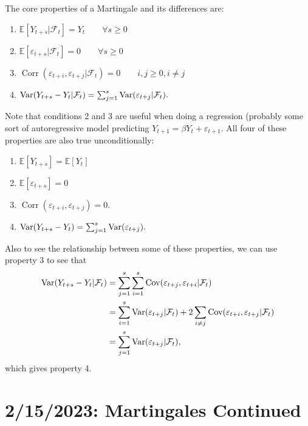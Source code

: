 \documentclass[12pt]{report}
\begin{document}
The core properties of a Martingale and its differences are: \begin{enumerate}
	\item $\mathbb E[Y_{t+s}|\mathcal F_t] = Y_t\qquad\forall s\geq 0$
	\item $\mathbb E[\varepsilon_{t+s}|\mathcal F_t] = 0\qquad\forall s\geq 0$
	\item $\operatorname{Corr}(\varepsilon_{t+i},\varepsilon_{t+j}|\mathcal F_t)=0\qquad i,j\geq 0, i\neq j$
	\item $\operatorname{Var}(Y_{t+s}-Y_t|\mathcal F_t) = \sum_{j=1}^{s} \operatorname{Var}(\varepsilon_{t+j}|\mathcal F_t). $
\end{enumerate} Note that conditions 2 and 3 are useful when doing a regression (probably some sort of autoregressive model predicting $Y_{t+1}=\beta Y_t+\varepsilon_{t+1}$. All four of these properties are also true unconditionally: \begin{enumerate}
	\item $\mathbb E[Y_{t+s}] = \mathbb E[Y_t]$
	\item $\mathbb E[\varepsilon_{t+s}] = 0$
	\item $\operatorname{Corr}(\varepsilon_{t+i},\varepsilon_{t+j}) = 0$.
	\item $\operatorname{Var}(Y_{t+s}-Y_t) = \sum_{j=1}^{s} \operatorname{Var}(\varepsilon_{t+j}). $
\end{enumerate} 
Also to see the relationship between some of these properties, we can use property 3 to see that \begin{align*}
	\operatorname{Var}(Y_{t+s}-Y_t|\mathcal F_t) &= \sum_{j=1}^{s} \sum_{i=1}^{s} \operatorname{Cov}(\varepsilon_{t+j},\varepsilon_{t+i}|\mathcal F_t)   \\
								   &= \sum_{i=1}^{s} \operatorname{Var}(\varepsilon_{t+j}|\mathcal F_t) + 2 \sum_{i\neq j}^{} \operatorname{Cov}(\varepsilon_{t+i},\varepsilon_{t+j}|\mathcal F_t) \\
								   &= \sum_{j=1}^{s} \operatorname{Var}(\varepsilon_{t+j}|\mathcal F_t), 
\end{align*} which gives property 4.

\chapter{2/15/2023: Martingales Continued}
\end{document}

